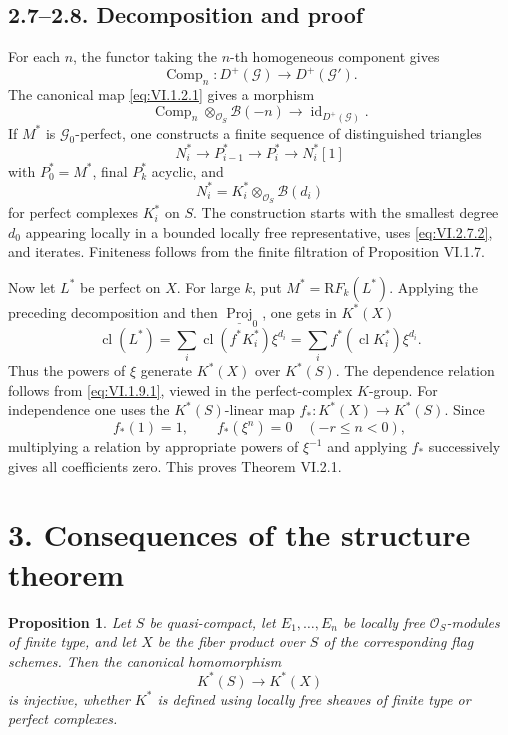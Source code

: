 \documentclass[13pt]{extarticle}
\newcommand{\cO}{\mathcal O}
\newcommand{\Proj}{\operatorname{Proj}}
\newcommand{\cl}{\operatorname{cl}}
\newcommand{\id}{\operatorname{id}}
\newcommand{\RR}{\mathrm R}
\newcommand{\Comp}{\operatorname{Comp}}
\newtheorem*{proposition}{Proposition}
\begin{document}
\subsection*{2.7--2.8. Decomposition and proof}
For each $n$, the functor taking the $n$-th homogeneous component gives
\[
\Comp_n:D^+(\mathcal G)\longrightarrow D^+(\mathcal G').
\]
The canonical map \eqref{eq:VI.1.2.1} gives a morphism
\begin{equation}\label{eq:VI.2.7.2}
\Comp_n\otimes_{\cO_S}\mathcal B(-n)\longrightarrow\id_{D^+(\mathcal G)}.
\end{equation}
If $M^*$ is $\mathcal G_0$-perfect, one constructs a finite sequence of distinguished triangles
\[
N_i^*\to P_{i-1}^*\to P_i^*\to N_i^*[1]
\]
with $P_0^*=M^*$, final $P_k^*$ acyclic, and
\[
N_i^*=K_i^*\otimes_{\cO_S}\mathcal B(d_i)
\]
for perfect complexes $K_i^*$ on $S$. The construction starts with the smallest degree $d_0$ appearing locally in a bounded locally free representative, uses \eqref{eq:VI.2.7.2}, and iterates. Finiteness follows from the finite filtration of Proposition VI.1.7.

Now let $L^*$ be perfect on $X$. For large $k$, put $M^*=\RR F_k(L^*)$. Applying the preceding decomposition and then $\underline{\Proj}_0$, one gets in $K^*(X)$
\[
\cl(L^*)=\sum_i\cl(f^*K_i^*)\xi^{d_i}=\sum_if^*(\cl K_i^*)\xi^{d_i}.
\]
Thus the powers of $\xi$ generate $K^*(X)$ over $K^*(S)$. The dependence relation follows from \eqref{eq:VI.1.9.1}, viewed in the perfect-complex $K$-group. For independence one uses the $K^*(S)$-linear map $f_*:K^*(X)\to K^*(S)$. Since
\[
f_*(1)=1,
\qquad
f_*(\xi^n)=0\quad(-r\leq n<0),
\]
multiplying a relation by appropriate powers of $\xi^{-1}$ and applying $f_*$ successively gives all coefficients zero. This proves Theorem VI.2.1.

\section*{3. Consequences of the structure theorem}

\begin{proposition}\label{prop:VI.3.1}
Let $S$ be quasi-compact, let $E_1,\ldots,E_n$ be locally free $\cO_S$-modules of finite type, and let $X$ be the fiber product over $S$ of the corresponding flag schemes. Then the canonical homomorphism
\[
K^*(S)\longrightarrow K^*(X)
\]
is injective, whether $K^*$ is defined using locally free sheaves of finite type or perfect complexes.
\end{proposition}
\end{document}
